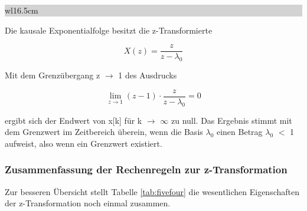 \noindent
\colorbox{lightgray}{%
%
\renewcommand\arraystretch{0.6}%
\begin{tabular}{ wl{16.5cm} }
{\selectfont{Beispiel: Endwertsatz}}
\end{tabular}%
}\medskip

\noindent Die kausale Exponentialfolge besitzt die z-Transformierte

\begin{equation}\label{eq:fiveeighty}
X\left(z\right)=\frac{z}{z-\lambda _{0} } 
\end{equation}

\noindent Mit dem Grenz\"{u}bergang z $\rightarrow$ 1 des Ausdrucks

\begin{equation}\label{eq:fiveeightyone}
{\mathop{\lim }\limits_{z\to 1}} \left(z-1\right)\cdot \frac{z}{z-\lambda _{0} } =0
\end{equation}

\noindent ergibt sich der Endwert von x[k] f\"{u}r k $\rightarrow$ $\infty$ zu null. Das Ergebnis stimmt mit dem Grenzwert im Zeitbereich \"{u}berein, wenn die Basis $\lambda_{0}$ einen Betrag {\textbar}$\lambda_{0}${\textbar} $\mathrm{<}$ 1 aufweist, also wenn ein Grenzwert existiert. 

\clearpage

\subsubsection{Zusammenfassung der Rechenregeln zur z-Transformation}

\noindent Zur besseren \"{U}bersicht stellt Tabelle \ref{tab:fivefour} die wesentlichen Eigenschaften der z-Transformation noch einmal zusammen.


